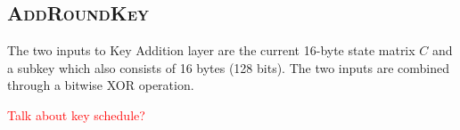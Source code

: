 \subsection{\textsc{AddRoundKey}}

The two inputs to Key Addition layer are the current 16-byte state matrix $C$ and a subkey which also consists of 16 bytes (128 bits).
The two inputs are combined through a bitwise XOR operation.

\textcolor{red}{Talk about key schedule?}
